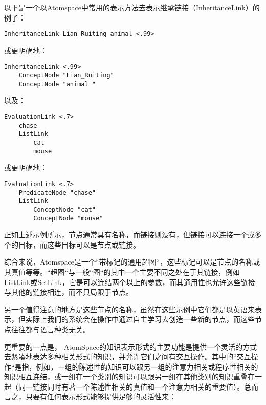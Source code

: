 以下是一个以Atomspace中常用的表示方法去表示继承链接（InheritanceLink）的例子：

{\tt\begin{small}\begin{lstlisting}
InheritanceLink Lian_Ruiting animal <.99>
\end{lstlisting}\end{small}}

\noindent 或更明确地：

 {\tt\begin{small}\begin{lstlisting}
InheritanceLink <.99>
	ConceptNode "Lian_Ruiting"
	ConceptNode "animal "
\end{lstlisting}\end{small}}

以及：

{\tt\begin{small}\begin{lstlisting}
EvaluationLink <.7>
	chase
	ListLink
		cat
		mouse
\end{lstlisting}\end{small}}

\noindent 或更明确地：

{\tt\begin{small}\begin{lstlisting}
EvaluationLink <.7>
	PredicateNode "chase"
	ListLink
		ConceptNode "cat"
		ConceptNode "mouse"
\end{lstlisting}\end{small}}

\noindent 正如上述示例所示，节点通常具有名称，而链接则没有，但链接可以连接一个或多个的目标，而这些目标可以是节点或链接。

综合来说，Atomspace是一个“带标记的通用超图“，这些标记可以是节点的名称或其真值等等。“超图“与一般“图“的其中一个主要不同之处在于其链接，例如ListLink或SetLink，它是可以连结两个以上的参数，而其通用性也允许这些链接与其他的链接相连，而不只局限于节点。

另一个值得注意的地方是这些节点的名称，虽然在这些示例中它们都是以英语来表示，但实际上我们的系统会在操作中通过自主学习去创造一些新的节点，而这些节点往往都与语言种类无关。

更重要的一点是， AtomSpace的知识表示形式的主要功能是提供一个灵活的方式去紧凑地表达多种相关形式的知识，并允许它们之间有交互操作。其中的“交互操作“是指，例如，一组的陈述性的知识可以跟另一组的注意力相关或程序性相关的知识相互连结，或一组在一个类别的知识可以跟另一组在其他类别的知识重叠在一起（同一链接同时有著一个陈述性相关的真值和一个注意力相关的重要值）。总而言之，只要有任何表示形式能够提供足够的灵活性来：

